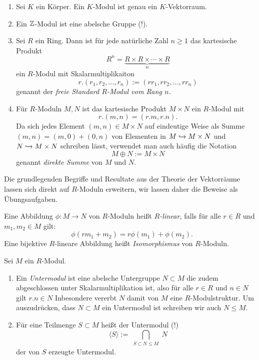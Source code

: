 \documentclass{book}
\begin{document}
\begin{exas}
    \label{exas:moduln}
    \begin{enumerate}
    \item Sei $K$ ein Körper. Ein $K$-Modul ist genau ein $K$-Vektorraum.
    \item Ein $\mathbb{Z}$-Modul ist eine abelsche Gruppe (!).
    \item Sei $R$ ein Ring. Dann ist für jede natürliche Zahl $n \ge 1$ das kartesische Produkt 
        \[
            R^n = \underbrace{R \times R \times \cdots \times R}_{n}
        \]
        ein $R$-Modul mit Skalarmultiplikaiton 
        \[
            r.(r_1,r_2,...,r_n) := (rr_1,rr_2,...,rr_n)
        \]
        genannt der \emph{freie Standard $R$-Modul vom Rang $n$.}
    \item Für $R$-Moduln $M,N$ ist das kartesische Produkt $M \times N$ ein $R$-Modul mit
        \[
            r.(m,n) = (r.m,r.n).
        \]
        Da sich jedes Element $(m,n) \in M \times N$ auf eindeutige Weise als
        Summe $(m,n) = (m,0) + (0,n)$ von Elementen in $M \hookrightarrow M \times N$ und $N \hookrightarrow M \times N$ schreiben
        lässt, verwendet man auch häufig die Notation 
        \[
            M \oplus N := M \times N
        \]
        genannt \emph{direkte Summe} von $M$ und $N$. 
    \end{enumerate}
\end{exas}

Die grundlegenden Begriffe und Resultate aus der Theorie der Vektorräume lassen sich direkt
auf $R$-Moduln erweitern, wir lassen daher die Beweise als Übungsaufgaben.

\begin{defi}
    \label{defi:hom}
    Eine Abbildung $\phi: M \to N$ von $R$-Moduln heißt \emph{$R$-linear}, falls für
    alle $r \in R$ und $m_1,m_2 \in M$ gilt:
    \[
        \phi(r m_1 + m_2 ) = r \phi(m_1) + \phi(m_2).
    \]
    Eine bijektive $R$-lineare Abbildung heißt \emph{Isomorphismus} von
    $R$-Moduln.
\end{defi}

\begin{defi}
    \label{defi:unter}
    Sei $M$ ein $R$-Modul. 

    \begin{enumerate}
        \item Ein \emph{Untermodul} ist eine abelsche Untergruppe $N
    \subset M$ die zudem abgeschlossen unter Skalarmultiplikation ist, also für
    alle $r \in R$ und $n \in N$ gilt $r.n \in N$ Inbesondere vererbt $N$ damit
    von $M$ eine $R$-Modulstruktur. Um auszudrücken, dass $N \subset M$ ein
    Untermodul ist schreiben wir auch $N \le M$. 
        \item Für eine Teilmenge $S \subset M$ heißt der Untermodul (!)
            \[
                \langle S \rangle := \bigcap_{\substack{S \subset N \le M }} N
            \]
            der von $S$ erzeugte Untermodul. 
    \end{enumerate} 
\end{defi}
\end{document}

